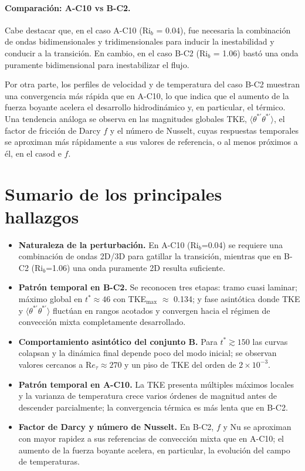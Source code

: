 \paragraph{Comparación: A-C10 vs B-C2.}
Cabe destacar que, en el caso A-C10 (Ri$_b$ = 0.04), fue necesaria la combinación de ondas bidimensionales y tridimensionales para inducir la inestabilidad y conducir a la transición. En cambio, en el caso B-C2 (Ri$_b$ = 1.06) bastó una onda puramente bidimensional para inestabilizar el flujo.

Por otra parte, los perfiles de velocidad y de temperatura del caso B-C2 muestran una convergencia más rápida que en A-C10, lo que indica que el aumento de la fuerza boyante acelera el desarrollo hidrodinámico y, en particular, el térmico. Una tendencia análoga se observa en las magnitudes globales TKE, $\langle \theta^{*\prime}\theta^{*\prime}\rangle$, el factor de fricción de Darcy $f$ y el número de Nusselt, cuyas respuestas temporales se aproximan más rápidamente a sus valores de referencia, o al menos próximos a él, en el casod e $f$.



\section{Sumario de los principales hallazgos}
\begin{itemize}

\item \textbf{Naturaleza de la perturbación.} En A-C10 (Ri$_b$=0.04) se requiere una combinación de ondas 2D/3D para gatillar la transición, mientras que en B-C2 (Ri$_b$=1.06) una onda puramente 2D resulta suficiente.

\item \textbf{Patrón temporal en B-C2.} Se reconocen tres etapas: tramo cuasi laminar; máximo global en $t^*\approx 46$ con TKE$_{\max}$ $\approx$ 0.134; y fase asintótica donde TKE y $\langle\theta^{*\prime}\theta^{*\prime}\rangle$ fluctúan en rangos acotados y convergen hacia el régimen de convección mixta completamente desarrollado.

\item \textbf{Comportamiento asintótico del conjunto B.} Para $t^*\gtrsim 150$ las curvas colapsan y la dinámica final depende poco del modo inicial; se observan valores cercanos a R$e_{\tau}\approx 270$ y un piso de TKE del orden de $2\times 10^{-3}$.

\item \textbf{Patrón temporal en A-C10.} La TKE presenta múltiples máximos locales y la varianza de temperatura crece varios órdenes de magnitud antes de descender parcialmente; la convergencia térmica es más lenta que en B-C2.

\item \textbf{Factor de Darcy y número de Nusselt.} En B-C2, $f$ y Nu se aproximan con mayor rapidez a sus referencias de convección mixta que en A-C10; el aumento de la fuerza boyante acelera, en particular, la evolución del campo de temperaturas.

\end{itemize}